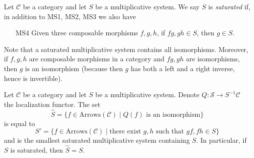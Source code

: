 \begin{definition}
\label{definition-saturated-multiplicative-system}
Let $\mathcal{C}$ be a category and let $S$ be a multiplicative system.
We say $S$ is {\it saturated} if, in addition to MS1, MS2, MS3 we
also have
\begin{enumerate}
\item[MS4] Given three composable morphisms $f, g, h$, if
$fg, gh \in S$, then $g \in S$.
\end{enumerate}
\end{definition}

\noindent
Note that a saturated multiplicative system contains all isomorphisms.
Moreover, if  $f, g, h$ are composable morphisms in a category and
$fg, gh$ are isomorphisms, then $g$ is an isomorphism (because then $g$
has both a left and a right inverse, hence is invertible).

\begin{lemma}
\label{lemma-what-gets-inverted}
Let $\mathcal{C}$ be a category and let $S$ be a multiplicative system.
Denote $Q : \mathcal{S} \to S^{-1}\mathcal{C}$ the localization functor.
The set
$$
\hat S = \{f \in \text{Arrows}(\mathcal{C}) \mid
Q(f) \text{ is an isomorphism}\}
$$
is equal to
$$
S' = \{f \in \text{Arrows}(\mathcal{C}) \mid
\text{there exist }g, h\text{ such that }gf, fh \in S\}
$$
and is the smallest saturated multiplicative system containing $S$.
In particular, if $S$ is saturated, then $\hat S = S$.
\end{lemma}


